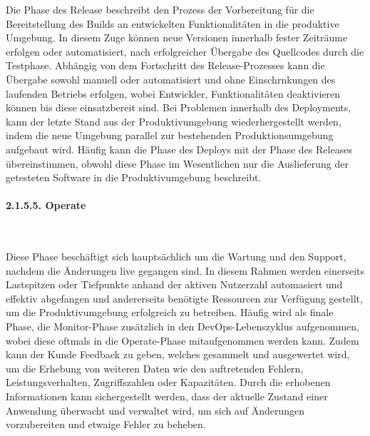 Die Phase des Release beschreibt den Prozess der Vorbereitung für die Bereitstellung des Builds an entwickelten Funktionalitäten in die produktive Umgebung. \cite[S. 20]{halstenberg_devops_2020} In diesem Zuge können neue Versionen innerhalb fester Zeiträume erfolgen oder automatisiert, nach erfolgreicher Übergabe des Quellcodes durch die Testphase. \cite{thedev_eight_2019} Abhängig von dem Fortschritt des Release-Prozesses kann die Übergabe sowohl manuell oder automatisiert und ohne Einschrnkungen des laufenden Betriebs erfolgen, wobei Entwickler, Funktionalitäten deaktivieren können bis diese einsatzbereit sind. \cite{thedev_eight_2019} Bei Problemen innerhalb des Deployments, kann der letzte Stand aus der Produktivumgebung wiederhergestellt werden, indem die neue Umgebung parallel zur bestehenden Produktionsumgebung aufgebaut wird. Häufig kann die Phase des Deploys mit der Phase des Releases übereinstimmen, obwohl diese Phase im Wesentlichen nur die Auslieferung der getesteten Software in die Produktivumgebung beschreibt. \cite[S. 20]{halstenberg_devops_2020}

\paragraph{2.1.5.5. Operate} $~$

Diese Phase beschäftigt sich hauptsächlich um die Wartung und den Support, nachdem die Änderungen live gegangen sind. In diesem Rahmen werden einerseits Lastspitzen oder Tiefpunkte anhand der aktiven Nutzerzahl automasiert und effektiv abgefangen und andererseits benötigte Ressourcen zur Verfügung gestellt, um die Produktivumgebung erfolgreich zu betreiben. \cite{thedev_eight_2019} Häufig wird als finale Phase, die Monitor-Phase zusätzlich in den DevOps-Lebenszyklus aufgenommen, wobei diese oftmals in die Operate-Phase mitaufgenommen werden kann. Zudem kann der Kunde Feedback zu geben, welches gesammelt und ausgewertet wird, um die Erhebung von weiteren Daten wie den auftretenden Fehlern, Leistungsverhalten, Zugriffszahlen oder Kapazitäten. \cite{thedev_eight_2019} Durch die erhobenen Informationen kann sichergestellt werden, dass der aktuelle Zustand einer Anwendung überwacht und verwaltet wird, um sich auf Änderungen vorzubereiten und etwaige Fehler zu beheben. \cite[S. 127]{sturm_devops_2017} \\

















